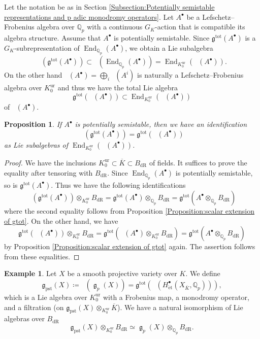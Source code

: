 \documentclass[12pt,reqno]{amsart}
\newtheorem{prop}[thm]{Proposition}
\theoremstyle{definition}
\newtheorem{ex}[thm]{Example}
\newcommand{\Q}{{\mathds Q}}
\DeclareMathOperator{\Dpst}{\mathit{D}_{\mathrm{pst}}}
\newcommand\End{\mathop{\mathrm{End}}\nolimits}
\renewcommand\ge{\mathop{\mathfrak{g}}\nolimits}
\newcommand\dR{\mathop{\mathrm{dR}}}
\newcommand{\et}{\mathrm{\acute{e}t}}
\newcommand{\frg}{\mathfrak{g}}
\DeclareMathOperator{\tot}{tot}
\DeclareMathOperator{\pst}{pst}
\DeclareMathOperator{\ur}{ur}
\numberwithin{equation}{section}
\begin{document}
Let the notation be as in Section \ref{Subsection:Potentially semistable representations and p adic monodromy operators}.
Let $A^\bullet$ be a Lefschetz--Frobenius algebra over $\Q_p$ with a continuous $G_K$-action that is compatible its algebra structure.
Assume that $A^\bullet$ is potentially semistable.
Since $\frg^{\tot}(A^{\bullet})$ is a $G_K$-subrepresentation of $\End_{\Q_p}(A^{\bullet})$, we obtain 
a Lie subalgebra
\[
\Dpst(\frg^{\tot}(A^{\bullet})) \subset \Dpst(\End_{\Q_p}(A^{\bullet}))=\End_{K_0^{\ur}}(\Dpst(A^{\bullet})).
\]
On the other hand
$\Dpst(A^{\bullet})= \bigoplus_i \Dpst(A^i)$
is naturally a Lefschetz--Frobenius algebra over
$K_0^{\ur}$
and thus we have the total Lie algebra
\[
\frg^{\tot}(\Dpst(A^{\bullet})) \subset \End_{K_0^{\ur}}(\Dpst(A^{\bullet}))
\]
of $\Dpst(A^{\bullet})$.

\begin{prop}\label{Proposition:LLV algebra for potentially semistable representation}
    If $A^\bullet$ is potentially semistable, then we have an identification
    \[
    \Dpst(\frg^{\tot}(A^{\bullet})) = \frg^{\tot}(\Dpst(A^{\bullet}))
    \]
    as Lie subalgebras of $\End_{K_0^{\ur}}(\Dpst(A^{\bullet}))$.
\end{prop}

\begin{proof}
    We have the inclusions
    $K_0^{\ur} \subset \overline{K} \subset B_{\dR}$
    of fields.
    It suffices to prove the equality after tensoring with $B_{\dR}$.
    Since $\End_{\Q_p}(A^{\bullet})$ is potentially semistable, so is $\frg^{\tot}(A^{\bullet})$.
    Thus we have the following identifications
    \[
    \Dpst(\frg^{\tot}(A^{\bullet})) \otimes_{K_0^{\ur}} B_{\dR} 
    = \frg^{\tot}(A^{\bullet}) \otimes_{\Q_p} B_{\dR}
    = \frg^{\tot}(A^{\bullet} \otimes_{\Q_p} B_{\dR})
    \]
    where the second equality follows from Proposition \ref{Proposition:scalar extension of gtot}.
    On the other hand,
    we have
    \[
    \frg^{\tot}(\Dpst(A^{\bullet})) \otimes_{K_0^{\ur}} B_{\dR} = \frg^{\tot}( \Dpst(A^{\bullet}) \otimes_{K_0^{\ur}} B_{\dR}) = \frg^{\tot}( A^{\bullet}\otimes_{\Q_p} B_{\dR})
    \]
    by Proposition \ref{Proposition:scalar extension of gtot} again.
    The assertion follows from these equalities. 
\end{proof}

\begin{ex}\label{Example:p-adic LLV}
Let $X$ be a smooth projective variety over $K$.
We
define
\[
\frg_{\pst}(X)\coloneqq \Dpst(\ge_p(X)) = \frg^{\tot}(\Dpst(H_{\et}^{\bullet}(X_{\overline{K}},\Q_{p}))),
\]
which is a Lie algebra over $K_0^{\ur}$ with a Frobenius map, a monodromy operator, and a filtration (on $\frg_{\pst}(X) \otimes_{K_0^{\ur}} \overline{K}$).
We have a natural isomorphism
of Lie algebras over $B_{\dR}$
\begin{equation}\label{eq:deRham comparison}
\frg_{\pst}(X)\otimes_{K_0^{\ur}} B_{\dR} \simeq \ge_p(X) \otimes_{\Q_p} B_{\dR}.
\end{equation}
\end{ex}
\end{document}
